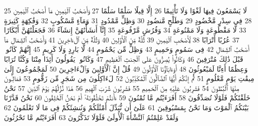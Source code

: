 {\tiny\colorbox{cl_aya}{25}} لَا يَسْمَعُونَ فِيهَا لَغْوًا وَلَا تَأْثِيمًا
{\tiny\colorbox{cl_aya}{26}} إِلَّا قِيلًا سَلَٰمًا سَلَٰمًا
{\tiny\colorbox{cl_aya}{27}} وَأَصْحَٰبُ ٱلْيَمِينِ مَآ أَصْحَٰبُ ٱلْيَمِينِ
{\tiny\colorbox{cl_aya}{28}} فِى سِدْرٍ مَّخْضُودٍ
{\tiny\colorbox{cl_aya}{29}} وَطَلْحٍ مَّنضُودٍ
{\tiny\colorbox{cl_aya}{30}} وَظِلٍّ مَّمْدُودٍ
{\tiny\colorbox{cl_aya}{31}} وَمَآءٍ مَّسْكُوبٍ
{\tiny\colorbox{cl_aya}{32}} وَفَٰكِهَةٍ كَثِيرَةٍ
{\tiny\colorbox{cl_aya}{33}} لَّا مَقْطُوعَةٍ وَلَا مَمْنُوعَةٍ
{\tiny\colorbox{cl_aya}{34}} وَفُرُشٍ مَّرْفُوعَةٍ
{\tiny\colorbox{cl_aya}{35}} إِنَّآ أَنشَأْنَٰهُنَّ إِنشَآءً
{\tiny\colorbox{cl_aya}{36}} فَجَعَلْنَٰهُنَّ أَبْكَارًا
{\tiny\colorbox{cl_aya}{37}} عُرُبًا أَتْرَابًا
{\tiny\colorbox{cl_aya}{38}} لِّأَصْحَٰبِ ٱلْيَمِينِ
{\tiny\colorbox{cl_aya}{39}} ثُلَّةٌ مِّنَ ٱلْأَوَّلِينَ
{\tiny\colorbox{cl_aya}{40}} وَثُلَّةٌ مِّنَ ٱلْءَاخِرِينَ
{\tiny\colorbox{cl_aya}{41}} وَأَصْحَٰبُ ٱلشِّمَالِ مَآ أَصْحَٰبُ ٱلشِّمَالِ
{\tiny\colorbox{cl_aya}{42}} فِى سَمُومٍ وَحَمِيمٍ
{\tiny\colorbox{cl_aya}{43}} وَظِلٍّ مِّن يَحْمُومٍ
{\tiny\colorbox{cl_aya}{44}} لَّا بَارِدٍ وَلَا كَرِيمٍ
{\tiny\colorbox{cl_aya}{45}} إِنَّهُمْ كَانُوا۟ قَبْلَ ذَٰلِكَ مُتْرَفِينَ
{\tiny\colorbox{cl_aya}{46}} وَكَانُوا۟ يُصِرُّونَ عَلَى ٱلْحِنثِ ٱلْعَظِيمِ
{\tiny\colorbox{cl_aya}{47}} وَكَانُوا۟ يَقُولُونَ أَئِذَا مِتْنَا وَكُنَّا تُرَابًا وَعِظَٰمًا أَءِنَّا لَمَبْعُوثُونَ
{\tiny\colorbox{cl_aya}{48}} أَوَءَابَآؤُنَا ٱلْأَوَّلُونَ
{\tiny\colorbox{cl_aya}{49}} قُلْ إِنَّ ٱلْأَوَّلِينَ وَٱلْءَاخِرِينَ
{\tiny\colorbox{cl_aya}{50}} لَمَجْمُوعُونَ إِلَىٰ مِيقَٰتِ يَوْمٍ مَّعْلُومٍ
{\tiny\colorbox{cl_aya}{51}} ثُمَّ إِنَّكُمْ أَيُّهَا ٱلضَّآلُّونَ ٱلْمُكَذِّبُونَ
{\tiny\colorbox{cl_aya}{52}} لَءَاكِلُونَ مِن شَجَرٍ مِّن زَقُّومٍ
{\tiny\colorbox{cl_aya}{53}} فَمَالِـُٔونَ مِنْهَا ٱلْبُطُونَ
{\tiny\colorbox{cl_aya}{54}} فَشَٰرِبُونَ عَلَيْهِ مِنَ ٱلْحَمِيمِ
{\tiny\colorbox{cl_aya}{55}} فَشَٰرِبُونَ شُرْبَ ٱلْهِيمِ
{\tiny\colorbox{cl_aya}{56}} هَٰذَا نُزُلُهُمْ يَوْمَ ٱلدِّينِ
{\tiny\colorbox{cl_aya}{57}} نَحْنُ خَلَقْنَٰكُمْ فَلَوْلَا تُصَدِّقُونَ
{\tiny\colorbox{cl_aya}{58}} أَفَرَءَيْتُم مَّا تُمْنُونَ
{\tiny\colorbox{cl_aya}{59}} ءَأَنتُمْ تَخْلُقُونَهُۥٓ أَمْ نَحْنُ ٱلْخَٰلِقُونَ
{\tiny\colorbox{cl_aya}{60}} نَحْنُ قَدَّرْنَا بَيْنَكُمُ ٱلْمَوْتَ وَمَا نَحْنُ بِمَسْبُوقِينَ
{\tiny\colorbox{cl_aya}{61}} عَلَىٰٓ أَن نُّبَدِّلَ أَمْثَٰلَكُمْ وَنُنشِئَكُمْ فِى مَا لَا تَعْلَمُونَ
{\tiny\colorbox{cl_aya}{62}} وَلَقَدْ عَلِمْتُمُ ٱلنَّشْأَةَ ٱلْأُولَىٰ فَلَوْلَا تَذَكَّرُونَ
{\tiny\colorbox{cl_aya}{63}} أَفَرَءَيْتُم مَّا تَحْرُثُونَ
